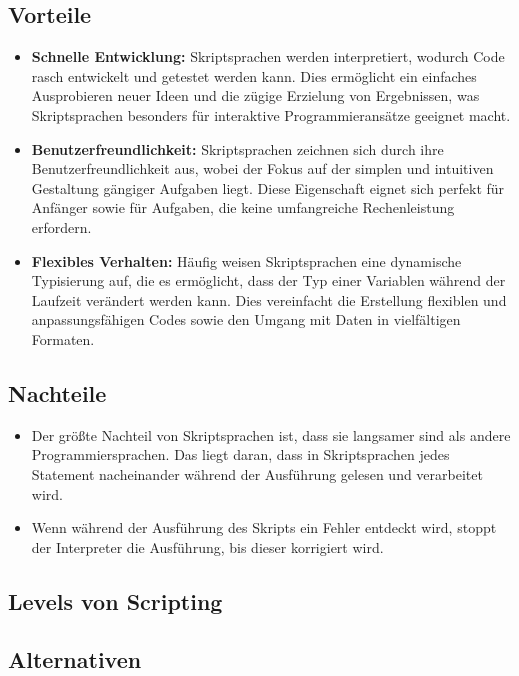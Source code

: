 \subsection*{Vorteile}

\begin{itemize}
    \item \textbf{Schnelle Entwicklung:} Skriptsprachen werden interpretiert, 
    wodurch Code rasch entwickelt und getestet werden kann. 
    Dies ermöglicht ein einfaches Ausprobieren neuer Ideen und die zügige 
    Erzielung von Ergebnissen, was Skriptsprachen besonders für interaktive 
    Programmieransätze geeignet macht.
    \item \textbf{Benutzerfreundlichkeit:} Skriptsprachen zeichnen sich durch ihre 
    Benutzerfreundlichkeit aus, wobei der Fokus auf der simplen und intuitiven 
    Gestaltung gängiger Aufgaben liegt. Diese Eigenschaft eignet sich perfekt für Anfänger 
    sowie für Aufgaben, die keine umfangreiche Rechenleistung erfordern.
    \item \textbf{Flexibles Verhalten:} Häufig weisen Skriptsprachen eine dynamische 
    Typisierung auf, die es ermöglicht, dass der Typ einer Variablen während der 
    Laufzeit verändert werden kann. Dies vereinfacht die Erstellung flexiblen und 
    anpassungsfähigen Codes sowie den Umgang mit Daten in vielfältigen Formaten.

\end{itemize}

\subsection*{Nachteile}

\begin{itemize}
    \item Der größte Nachteil von Skriptsprachen ist, dass sie langsamer sind als 
    andere Programmiersprachen. Das liegt daran, dass in Skriptsprachen jedes 
    Statement nacheinander während der Ausführung gelesen und verarbeitet wird.
    \item Wenn während der Ausführung des Skripts ein Fehler entdeckt wird, 
    stoppt der Interpreter die Ausführung, bis dieser korrigiert wird.
\end{itemize}

\subsection*{Levels von Scripting}



\subsection*{Alternativen}